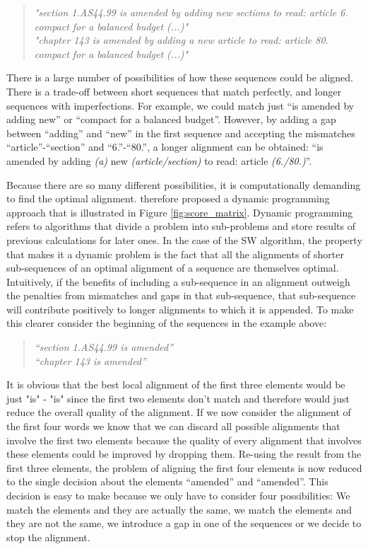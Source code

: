 \documentclass[12pt]{article} %
\begin{document}
\begin{quote}
\textit{"section 1.AS44.99 is amended by adding new sections to read: article 6. compact for a balanced budget (...)"} \\
\textit{"chapter 143 is amended by adding a new article to read: article 80. compact for a balanced budget (...)"}
\end{quote}

There is a large number of possibilities of how these sequences could be aligned. There is a trade-off between short sequences that match perfectly, and longer sequences with imperfections. For example, we could match just ``is amended by adding new'' or ``compact for a balanced budget''. However, by adding a gap between ``adding'' and ``new'' in the first sequence and accepting the mismatches ``article''-``section'' and ``6.''-``80.'', a longer alignment can be obtained: ``is amended by adding \textit{(a)} new \textit{(article/section)} to read: article \textit{(6./80.)}''. 

Because there are so many different possibilities, it is computationally demanding to find the optimal alignment. \citet{smith1981identification} therefore proposed a dynamic programming approach that is illustrated in Figure \ref{fig:score_matrix}. Dynamic programming refers to algorithms that divide a problem into sub-problems and store results of previous calculations for later ones. In the case of the SW algorithm, the property that makes it a dynamic problem is the fact that all the alignments of shorter sub-sequences of an optimal alignment of a sequence are themselves optimal. Intuitively, if the benefits of including a sub-sequence in an alignment outweigh the penalties from mismatches and gaps in that sub-sequence, that sub-sequence will contribute positively to longer alignments to which it is appended. To make this clearer consider the beginning of the sequences in the example above:

\begin{quote}
\textit{``section 1.AS44.99 is amended''}\\
\textit{``chapter 143 is amended''}
\end{quote}

It is obvious that the best local alignment of the first three elements would be just "is" - "is" since the first two elements don't match and therefore would just reduce the overall quality of the alignment. If we now consider the alignment of the first four words we know that we can discard all possible alignments that involve the first two elements because the quality of every alignment that involves these elements could be improved by dropping them. Re-using the result from the first three elements, the problem of aligning the first four elements is now reduced to the single decision about the elements ``amended'' and ``amended''. This decision is easy to make because we only have to consider four possibilities: We match the elements and they are actually the same, we match the elements and they are not the same, we introduce a gap in one of the sequences or we decide to stop the alignment. 
\end{document}
